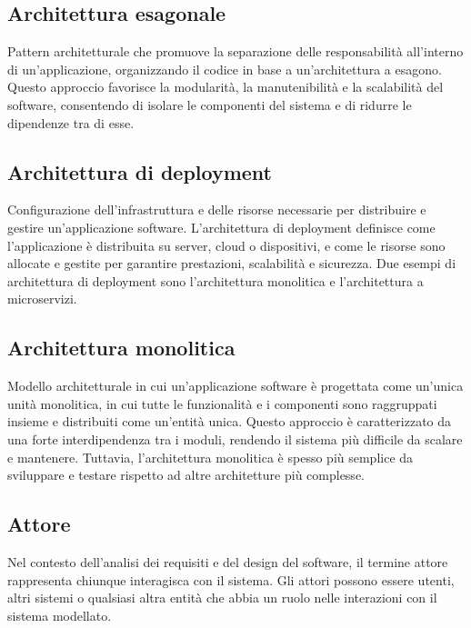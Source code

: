 \hypertarget{sec:architettura_esagonale}{}
\subsection*{Architettura esagonale}
Pattern architetturale che promuove la separazione delle responsabilità all'interno di un'applicazione, organizzando il codice in base a un'architettura
a esagono. Questo approccio favorisce la modularità, la manutenibilità e la scalabilità del software, consentendo di isolare le componenti del sistema e
di ridurre le dipendenze tra di esse.

\hypertarget{sec:architettura_deployment}{}
\subsection*{Architettura di deployment}
Configurazione dell'infrastruttura e delle risorse necessarie per distribuire e gestire un'applicazione software. L'architettura di deployment definisce
come l'applicazione è distribuita su server, cloud o dispositivi, e come le risorse sono allocate e gestite per garantire prestazioni, scalabilità e sicurezza.
Due esempi di architettura di deployment sono l'architettura monolitica e l'architettura a microservizi.

\hypertarget{sec:architettura_monolitica}{}
\subsection*{Architettura monolitica}
Modello architetturale in cui un'applicazione software è progettata come un'unica unità monolitica, in cui tutte le funzionalità e i componenti sono
raggruppati insieme e distribuiti come un'entità unica. Questo approccio è caratterizzato da una forte interdipendenza tra i moduli, rendendo il sistema
più difficile da scalare e mantenere. Tuttavia, l'architettura monolitica è spesso più semplice da sviluppare e testare rispetto ad altre architetture
più complesse.

\hypertarget{sec:attore}{}
\subsection*{Attore}
Nel contesto dell'analisi dei requisiti e del design del software, il termine attore rappresenta chiunque interagisca con il sistema. Gli attori possono 
essere utenti, altri sistemi o qualsiasi altra entità che abbia un ruolo nelle interazioni con il sistema modellato.


